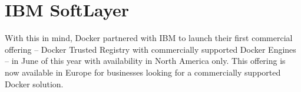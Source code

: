 \documentclass[../main.tex]{subfiles}
\begin{document}




  \section{IBM SoftLayer}



    \cite{http://blog.softlayer.com/2015/docker-containerization-software}

    With this in mind, Docker partnered with IBM to launch their first commercial offering – Docker Trusted Registry with commercially supported Docker Engines – in June of this year with availability in North America only. This offering is now available in Europe for businesses looking for a commercially supported Docker solution.
\end{document}
